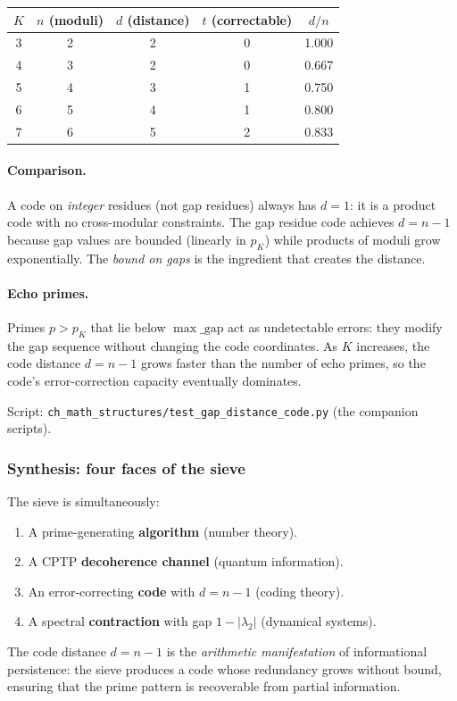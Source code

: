 \documentclass[12pt,a4paper]{article}
\begin{document}
\begin{center}
\begin{tabular}{ccccc}
\toprule
$K$ & $n$ (moduli) & $d$ (distance) & $t$ (correctable) & $d/n$ \\
\midrule
3 & 2 & 2 & 0 & 1.000 \\
4 & 3 & 2 & 0 & 0.667 \\
5 & 4 & 3 & 1 & 0.750 \\
6 & 5 & 4 & 1 & 0.800 \\
7 & 6 & 5 & 2 & 0.833 \\
\bottomrule
\end{tabular}
\end{center}

\paragraph{Comparison.} A code on \emph{integer} residues (not gap
residues) always has $d = 1$: it is a product code with no
cross-modular constraints. The gap residue code achieves $d = n-1$
because gap values are bounded (linearly in $p_K$) while products
of moduli grow exponentially. The \emph{bound on gaps} is the
ingredient that creates the distance.

\paragraph{Echo primes.} Primes $p > p_K$ that lie below $\max\_\mathrm{gap}$
act as undetectable errors: they modify the gap sequence without
changing the code coordinates. As $K$ increases, the code distance
$d = n - 1$ grows faster than the number of echo primes, so the
code's error-correction capacity eventually dominates.

Script: \texttt{ch\_math\_structures/test\_gap\_distance\_code.py} (the companion scripts).

\subsubsection{Synthesis: four faces of the sieve}

The sieve is simultaneously:
\begin{enumerate}[nosep]
\item A prime-generating \textbf{algorithm} (number theory).
\item A CPTP \textbf{decoherence channel} (quantum information).
\item An error-correcting \textbf{code} with $d = n - 1$ (coding theory).
\item A spectral \textbf{contraction} with gap $1 - |\lambda_2|$
  (dynamical systems).
\end{enumerate}
The code distance $d = n - 1$ is the \emph{arithmetic manifestation}
of informational persistence: the sieve produces a code whose
redundancy grows without bound, ensuring that the prime pattern
is recoverable from partial information.
\end{document}
